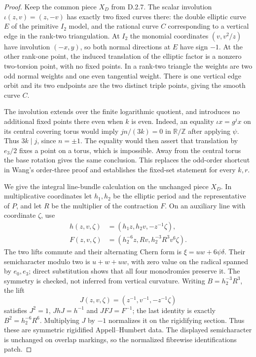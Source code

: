 \begin{proof}
Keep the common piece $X_D$ from D.2.7. The scalar involution
$\iota(z,v)=(z,-v)$ has exactly two fixed curves there: the
double elliptic curve $E$ of the primitive $I_2$ model, and the
rational curve $C$ corresponding to a vertical edge in the
rank-two triangulation. At $I_2$ the monomial coordinates
$(v,v^2/z)$ have involution $(-x,y)$, so both normal directions
at $E$ have sign $-1$. At the other rank-one point, the induced
translation of the elliptic factor is a nonzero two-torsion
point, with no fixed points. In a rank-two triangle the weights
are two odd normal weights and one even tangential weight.
There is one vertical edge orbit and its two endpoints are the
two distinct triple points, giving the smooth curve $C$.

The involution extends over the finite logarithmic quotient,
and introduces no additional fixed points there even when $k$
is even. Indeed, an equality $\iota x=g^j x$ on its central
covering torus would imply $jn/(3k)=0$ in $\mathbb R/\mathbb Z$
after applying $\psi$. Thus $3k\mid j$, since $n=\pm1$.
The equality would then assert that translation by $e_3/2$
fixes a point on a torus, which is impossible. Away from the
central torus the base rotation gives the same conclusion.
This replaces the odd-order shortcut in Wang's order-three
proof and establishes the fixed-set statement for every $k,r$.

We give the integral line-bundle calculation on the unchanged
piece $X_D$. In multiplicative coordinates let $h_1,h_2$ be
the elliptic period and the representative of $P$, and let $R$
be the multiplier of the contraction $F$. On an auxiliary line
with coordinate $\zeta$, use
\[
 \begin{aligned}
 h(z,v,\zeta)&=(h_1z,h_2v,-z^{-1}\zeta),\\
 F(z,v,\zeta)&=(h_2^{-6}z,Rv,h_2^{-3}R^3v^6\zeta).
 \end{aligned}
\]
The two lifts commute and their alternating Chern form is
$\xi=uw+6\psi\delta$. Their semicharacter modulo two is
$u+w+uw$, with zero value on the radical spanned by $e_0,e_3$;
direct substitution shows that all four monodromies preserve it.
The symmetry is checked, not inferred from vertical curvature.
Writing $B=h_2^{-3}R^3$, the lift
\[
 J(z,v,\zeta)=(z^{-1},v^{-1},-z^{-1}\zeta)
\]
satisfies $J^2=1$, $JhJ=h^{-1}$ and $JFJ=F^{-1}$;
the last identity is exactly $B^2=h_2^{-6}R^6$.
Multiplying $J$ by $-1$ normalizes it on the rigidifying section.
Thus these are symmetric rigidified Appell--Humbert data.
The displayed semicharacter is unchanged on overlap markings,
so the normalized fibrewise identifications patch.


\end{proof}
